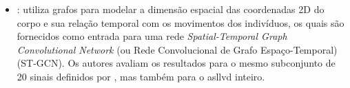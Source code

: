 \begin{itemize}
    \item {}: utiliza grafos para modelar a dimensão espacial das coordenadas 2D do corpo e sua relação temporal com os movimentos dos indivíduos, os quais são fornecidos como entrada para uma rede \textit{Spatial-Temporal Graph Convolutional Network} (ou Rede Convolucional de Grafo Espaço-Temporal) (ST-GCN).
    Os autores avaliam os resultados para o mesmo subconjunto de 20 sinais definidos por , mas também para o \acrshort{asllvd} inteiro.
\end{itemize}










